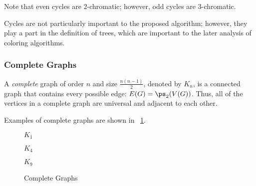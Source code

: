Note that even cycles are \(2\)-chromatic; however, odd cycles are \(3\)-chromatic.

Cycles are not particularly important to the proposed algorithm; however, they play a part in the definition of
trees, which are important to the later analysis of coloring algorithms.

\subsubsection{Complete Graphs}\label{sec:sub:sub:complete}

A \emph{complete} graph of order \(n\) and size \(\frac{n(n-1)}{2}\), denoted by \(K_n\), is a connected graph that
contains every possible edge: \(E(G)=\ps_2(V(G))\).  Thus, all of the vertices in a complete graph are universal and
adjacent to each other.

Examples of complete graphs are shown in \figurename~\ref{fig:complete}.

\begin{figure}[H]
  \label{fig:complete}
  \begin{minipage}{2in}
    \begin{center}

      \bigskip

      \(K_1\)
    \end{center}
  \end{minipage}
  \begin{minipage}{2in}
    \begin{center}

      \bigskip

      \(K_4\)
    \end{center}
  \end{minipage}
  \begin{minipage}{2in}
    \begin{center}

      \bigskip

      \(K_9\)
    \end{center}
  \end{minipage}
  \caption{Complete Graphs}
\end{figure}

